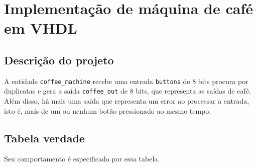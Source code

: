 \section{Implementação de máquina de café em
VHDL}\label{implementauxe7uxe3o-de-muxe1quina-de-cafuxe9-em-vhdl}

\subsection{Descrição do projeto}\label{descriuxe7uxe3o-do-projeto}

A entidade \texttt{coffee\_machine} recebe uma entrada \texttt{buttons}
de 8 bits procura por duplicatas e gera a saída \texttt{coffee\_out} de
8 bits, que representa as saídas de café. Além disso, há mais uma saída
que representa um error ao processar a entrada, isto é, mais de um ou
nenhum botão pressionado ao mesmo tempo.


\subsection{Tabela verdade}\label{tabela-verdade}

Seu comportamento é especificado por essa tabela.

